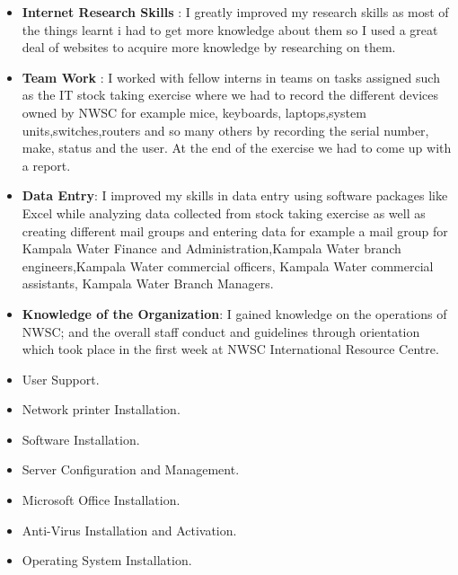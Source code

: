 \documentclass{article}
\begin{document}
\begin{itemize}
\item \textbf{Internet Research Skills} : I greatly improved my research skills as most of the things learnt i had to get more knowledge about them so I used a great deal of websites to acquire more knowledge by researching on them.
\item \textbf{Team Work} : I worked with fellow interns in teams on tasks assigned such as the IT stock taking exercise where we had to record the different devices owned by NWSC for example mice, keyboards, laptops,system units,switches,routers and so many others by recording the serial number, make, status and the user. At the end of the exercise we had to come up with a report. 
\item \textbf{Data Entry}: I improved my skills in data entry using software packages like Excel while analyzing data collected from stock taking exercise as well as creating different mail groups and entering data for example a mail group for Kampala Water Finance and Administration,Kampala Water branch engineers,Kampala Water commercial officers, Kampala Water commercial assistants, Kampala Water Branch Managers.
\item \textbf{Knowledge of the Organization}: I gained knowledge on the operations of NWSC; and the overall staff conduct and guidelines through orientation which took place in the first week at NWSC International Resource Centre.
\item User Support.
\item Network printer Installation.
\item Software Installation.
\item Server Configuration and Management.
\item Microsoft Office Installation.
\item Anti-Virus Installation and Activation.
\item Operating System Installation.
\end{itemize}
\end{document}
